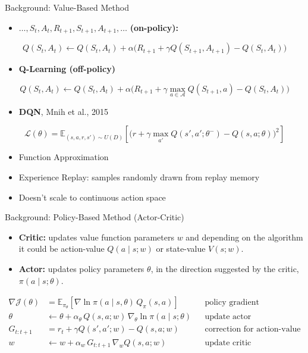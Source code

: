 \begin{frame}{Background: Value-Based Method}
\begin{itemize}
    \item $\ldots, S_t, A_t, R_{t+1}, S_{t+1}, A_{t+1}, \ldots$ \textbf{(on-policy):}
\end{itemize}
\[
Q(S_t, A_t) \leftarrow Q(S_t, A_t) + \alpha\big( R_{t+1} + \gamma Q(S_{t+1}, A_{t+1}) - Q(S_t, A_t) \big)
\]
\begin{itemize}
    \item \textbf{Q-Learning (off-policy)}
\end{itemize}
\[
Q(S_t, A_t) \leftarrow Q(S_t, A_t) + \alpha\big( R_{t+1} + \gamma \max_{a \in \mathcal{A}} Q(S_{t+1}, a) - Q(S_t, A_t) \big)
\]
\begin{itemize}
    \item \textbf{DQN}, Mnih et al., 2015
\end{itemize}
\[
\mathcal{L}(\theta) = \mathbb{E}_{(s,a,r,s') \sim U(D)}\!\left[ \Big( r + \gamma \max_{a'} Q(s', a'; \theta^{-}) - Q(s, a; \theta) \Big)^{2} \right]
\]
\begin{itemize}
    \item Function Approximation
    \item Experience Replay: samples randomly drawn from replay memory
    \item Doesn't scale to continuous action space
\end{itemize}
\end{frame}
\begin{frame}{Background: Policy-Based Method (Actor-Critic)}
\begin{itemize}
    \item \textbf{Critic:} updates value function parameters $w$ and depending on the algorithm it could be action-value $Q(a \mid s; w)$ or state-value $V(s; w)$.
    \item \textbf{Actor:} updates policy parameters $\theta$, in the direction suggested by the critic, $\pi(a \mid s; \theta)$.
\end{itemize}
\begin{align*}
\nabla \mathcal{J}(\theta) &= \mathbb{E}_{\pi_\theta}\!\left[ \nabla \ln \pi(a \mid s, \theta)\, Q_\pi(s, a) \right] && \text{policy gradient} \\
\theta &\leftarrow \theta + \alpha_\theta\, Q(s, a; w)\, \nabla_\theta \ln \pi(a \mid s; \theta) && \text{update actor} \\
G_{t:t+1} &= r_t + \gamma Q(s', a'; w) - Q(s, a; w) && \text{correction for action-value} \\
w &\leftarrow w + \alpha_w\, G_{t:t+1}\, \nabla_{\!w} Q(s, a; w) && \text{update critic}
\end{align*}
\end{frame}
